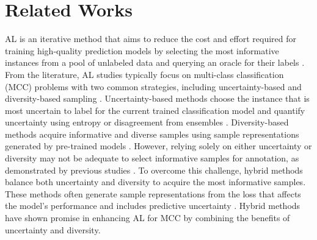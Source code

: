 \documentclass[letterpaper]{article} %
\begin{document}
\section{Related Works}
\label{sec:Related}

AL is an iterative method that aims to reduce the cost and effort required for training high-quality prediction models by selecting the most informative instances from a pool of unlabeled data and querying an oracle for their labels \cite{settles2009active, BEMPS_Wei_NEURIPS2011}. From the literature, AL studies typically focus on multi-class classification (MCC) problems with two common strategies, including uncertainty-based and diversity-based sampling \cite{ren2020survey}. Uncertainty-based methods choose the instance that is most uncertain to label for the current trained classification model and quantify uncertainty using entropy or disagreement from ensembles \cite{holub2008entropy}. Diversity-based methods acquire informative and diverse samples using sample representations generated by pre-trained models \cite{ash2019deep}. However, relying solely on either uncertainty or diversity may not be adequate to select informative samples for annotation, as demonstrated by previous studies \cite{ren2020survey, TanDuBun-IEEEPAMI23}. To overcome this challenge, hybrid methods balance both uncertainty and diversity to acquire the most informative samples. These methods often generate sample representations from the loss that affects the model's performance and includes predictive uncertainty \cite{ash2019deep, TanDuBun-IEEEPAMI23}.
Hybrid methods have shown promise in enhancing AL for MCC by combining the benefits of uncertainty and diversity.
\end{document}
